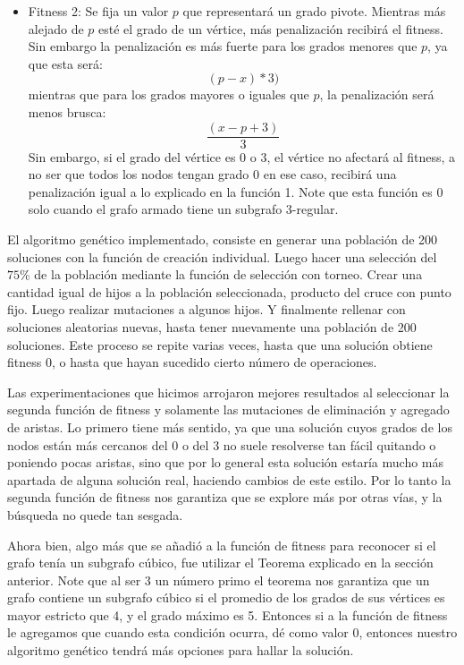 \documentclass{article}
\begin{document}
\begin{itemize}
\begin{itemize}
		\item Fitness 2: Se fija un valor $p$ que representará un grado pivote. Mientras más alejado de $p$ esté el grado de un vértice, más penalización recibirá el fitness. Sin embargo la penalización es más fuerte para los grados menores que $p$, ya que esta será:
		$$(p-x)*3)$$
		mientras que para los grados mayores o iguales que $p$, la penalización será menos brusca:
		$$\frac{(x - p + 3)}{3}$$
		Sin embargo, si el grado del vértice es $0$ o $3$, el vértice no afectará al fitness, a no ser que todos los nodos tengan grado $0$ en ese caso, recibirá una penalización igual a lo explicado en la función 1. Note que esta función es $0$ solo cuando el grafo armado tiene un subgrafo 3-regular.
	\end{itemize}	
\end{itemize}

El algoritmo genético implementado, consiste en generar una población de 200 soluciones con la función de creación individual. Luego hacer una selección del $75\%$ de la población mediante la función de selección con torneo. Crear una cantidad igual de hijos a la población seleccionada, producto del cruce con punto fijo. Luego realizar mutaciones a algunos hijos. Y finalmente rellenar con soluciones aleatorias nuevas, hasta tener nuevamente una población de 200 soluciones. Este proceso se repite varias veces, hasta que una solución obtiene fitness $0$, o hasta que hayan sucedido cierto número de operaciones.

Las experimentaciones que hicimos arrojaron mejores resultados al seleccionar la segunda función de fitness y solamente las mutaciones de eliminación y agregado de aristas. Lo primero tiene más sentido, ya que una solución cuyos grados de los nodos están más cercanos del $0$ o del $3$ no suele resolverse tan fácil quitando o poniendo pocas aristas, sino que por lo general esta solución estaría mucho más apartada de alguna solución real, haciendo cambios de este estilo. Por lo tanto la segunda función de fitness nos garantiza que se explore más por otras vías, y la búsqueda no quede tan sesgada.

Ahora bien, algo más que se añadió a la función de fitness para reconocer si el grafo tenía un subgrafo cúbico, fue utilizar el Teorema explicado en la sección anterior. Note que al ser $3$ un número primo el teorema nos garantiza que un grafo contiene un subgrafo cúbico si el promedio de los grados de sus vértices es mayor estricto que 4, y el grado máximo es 5. Entonces si a la función de fitness le agregamos que cuando esta condición ocurra, dé como valor $0$, entonces nuestro algoritmo genético tendrá más opciones para hallar la solución.
\end{document}
